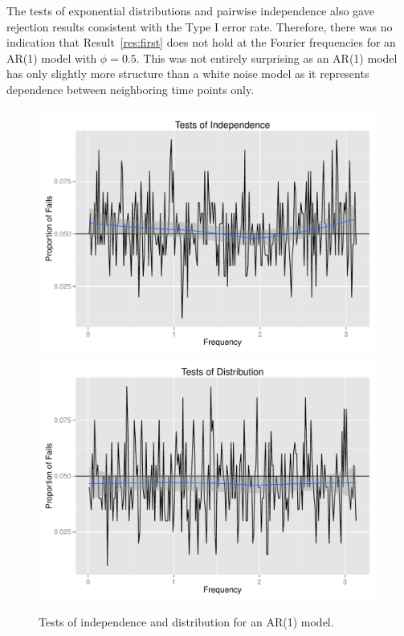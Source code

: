\documentclass{article}\usepackage{graphicx, color}
\newenvironment{knitrout}{}{} %
\theoremstyle{plain}
\begin{document}
The tests of exponential distributions and pairwise independence also gave rejection results consistent with the Type I error rate. Therefore, there was no indication that Result~\ref{res:first} does not hold at the Fourier frequencies for an AR(1) model with $\phi=0.5$. This was not entirely surprising as an AR(1) model has only slightly more structure than a white noise model as it represents dependence between neighboring time points only.
\begin{knitrout}
\color{fgcolor}\begin{figure}[H]

\includegraphics[width=.49\textwidth]{figure/tests-ar11} 
\includegraphics[width=.49\textwidth]{figure/tests-ar12} \caption[Tests of independence and distribution for an AR(1) model]{Tests of independence and distribution for an AR(1) model.\label{fig:tests-ar1}}
\end{figure}


\end{knitrout}
\end{document}

